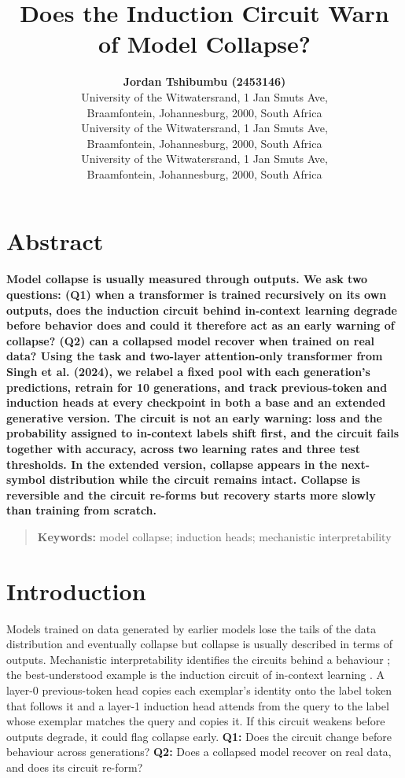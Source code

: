\documentclass[10pt,letterpaper]{article}
\title{Does the Induction Circuit Warn of Model Collapse?}
\author{{\large \bf Jordan Tshibumbu (2453146)} \\ University of the Witwatersrand, 1 Jan Smuts Ave,\\ Braamfontein, Johannesburg, 2000, South Africa
  \AND {\large \bf Mivuyo Mpepo (2562730)} \\ University of the Witwatersrand, 1 Jan Smuts Ave,\\ Braamfontein, Johannesburg, 2000, South Africa
  \AND {\large \bf Okwukwechukwu Mbajiorgu (2430639)} \\ University of the Witwatersrand, 1 Jan Smuts Ave,\\ Braamfontein, Johannesburg, 2000, South Africa}
\begin{document}
\maketitle
\phantom{.}
\newpage
\phantom{.}
\newpage
\section{Abstract}
{
\bf
{}
Model collapse is usually measured through outputs. We ask two questions: (Q1) when a transformer is trained recursively on its own outputs, does the induction circuit behind in-context learning degrade before behavior does and could it therefore act as an early warning of collapse? (Q2) can a collapsed model recover when trained on real data? Using the task and two-layer attention-only transformer from Singh et al. (2024), we relabel a fixed pool with each generation’s predictions, retrain for 10 generations, and track previous-token and induction heads at every checkpoint in both a base and an extended generative version. The circuit is not an early warning: loss and the probability assigned to in-context labels shift first, and the circuit fails together with accuracy, across two learning rates and three test thresholds. In the extended version, collapse appears in the next-symbol distribution while the circuit remains intact. Collapse is reversible and the circuit re-forms but recovery starts more slowly than training from scratch.
}
\begin{quote}
\small
\textbf{Keywords:}
model collapse; induction heads; mechanistic interpretability
\end{quote}

\section{Introduction} \label{Intro}
Models trained on data generated by earlier models lose the tails of the data distribution and eventually collapse \citep{shumailov2023curse,shumailov2024nature} but collapse is usually described in terms of outputs. Mechanistic interpretability identifies the circuits behind a behaviour \citep{conmy2023acdc}; the best-understood example is the induction circuit of in-context learning \citep{olsson2022induction,singh2024needs}. A layer-0 previous-token head copies each exemplar's identity onto the label token that follows it and a layer-1 induction head attends from the query to the label whose exemplar matches the query and copies it. If this circuit weakens before outputs degrade, it could flag collapse early. \textbf{Q1:} Does the circuit change before behaviour across generations? \textbf{Q2:} Does a collapsed model recover on real data, and does its circuit re-form?
\end{document}
